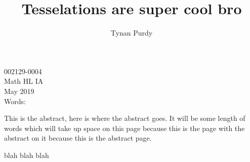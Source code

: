 \documentclass{article}
\title{Tesselations are super cool bro}
\author{Tynan Purdy}
\date{\vspace{-5ex}}
\begin{document}
\large
\parindent=0.5in
{\fontsize{12}{14.4}
	{\singlespace
	\maketitle
	\begin{center}
	\vspace{4mm}
	002129-0004 \\
	\vspace{4mm}
	Math HL IA \\
	\vspace{4mm}
	May 2019 \\
	\vspace{4mm}
	Words: \\
	\end{center}
	}
}	

\newpage
{
\Large
\begin{center}
\end{center}
}
This is the abstract, here is where the abstract goes. It will be some length of words which will take up space on this page because this is the page with the abstract on it because this is the abstract page.


\newpage
\tableofcontents

\newpage
blah blah blah
\end{document}
